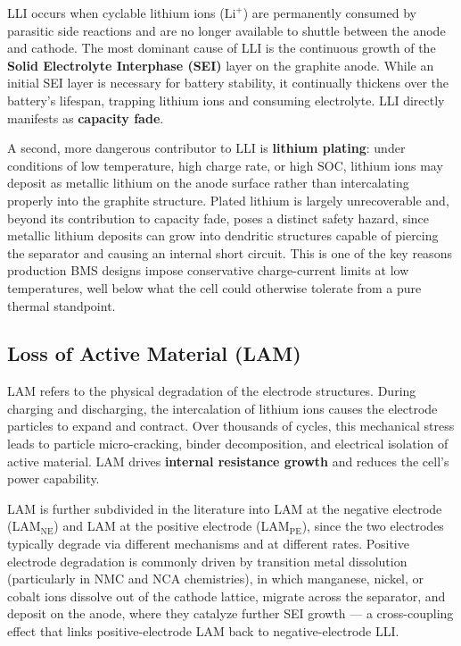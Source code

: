 LLI occurs when cyclable lithium ions ($\text{Li}^+$) are permanently consumed by parasitic side reactions and are no longer available to shuttle between the anode and cathode. The most dominant cause of LLI is the continuous growth of the \textbf{Solid Electrolyte Interphase (SEI)} layer on the graphite anode. While an initial SEI layer is necessary for battery stability, it continually thickens over the battery's lifespan, trapping lithium ions and consuming electrolyte. LLI directly manifests as \textbf{capacity fade}.

A second, more dangerous contributor to LLI is \textbf{lithium plating}: under conditions of low temperature, high charge rate, or high SOC, lithium ions may deposit as metallic lithium on the anode surface rather than intercalating properly into the graphite structure. Plated lithium is largely unrecoverable and, beyond its contribution to capacity fade, poses a distinct safety hazard, since metallic lithium deposits can grow into dendritic structures capable of piercing the separator and causing an internal short circuit. This is one of the key reasons production BMS designs impose conservative charge-current limits at low temperatures, well below what the cell could otherwise tolerate from a pure thermal standpoint.

\subsection{Loss of Active Material (LAM)}
\label{subsec:13_lam}

LAM refers to the physical degradation of the electrode structures. During charging and discharging, the intercalation of lithium ions causes the electrode particles to expand and contract. Over thousands of cycles, this mechanical stress leads to particle micro-cracking, binder decomposition, and electrical isolation of active material. LAM drives \textbf{internal resistance growth} and reduces the cell's power capability.

LAM is further subdivided in the literature into LAM at the negative electrode (LAM$_{\text{NE}}$) and LAM at the positive electrode (LAM$_{\text{PE}}$), since the two electrodes typically degrade via different mechanisms and at different rates. Positive electrode degradation is commonly driven by transition metal dissolution (particularly in NMC and NCA chemistries), in which manganese, nickel, or cobalt ions dissolve out of the cathode lattice, migrate across the separator, and deposit on the anode, where they catalyze further SEI growth — a cross-coupling effect that links positive-electrode LAM back to negative-electrode LLI.

